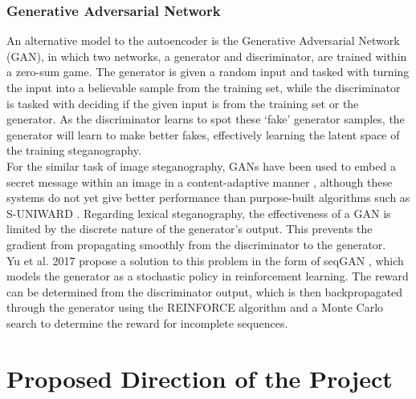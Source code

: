 \documentclass[11pt,a4paper]{article}
\begin{document}
  \subsubsection *{Generative Adversarial Network}
    An alternative model to the autoencoder is the Generative Adversarial Network (GAN), in which two networks, a generator and discriminator, are trained within a zero-sum game. The generator is given a random input and tasked with turning the input into a believable sample from the training set, while the discriminator is tasked with deciding if the given input is from the training set or the generator. As the discriminator learns to spot these `fake' generator samples, the generator will learn to make better fakes, effectively learning the latent space of the training steganography. \\
    \indent For the similar task of image steganography, GANs have been used to embed a secret message within an image in a content-adaptive manner \cite{gan2}, although these systems do not yet give better performance than purpose-built algorithms such as S-UNIWARD \cite{suniward}. Regarding lexical steganography, the effectiveness of a GAN is limited by the discrete nature of the generator's output. This prevents the gradient from propagating smoothly from the discriminator to the generator. \\
    \indent Yu et al. 2017 propose a solution to this problem in the form of seqGAN \nocite{seqgan}, which models the generator as a stochastic policy in reinforcement learning. The reward can be determined from the discriminator output, which is then backpropagated through the generator using the REINFORCE algorithm and a Monte Carlo search to determine the reward for incomplete sequences.




\section *{Proposed Direction of the Project}
  
\end{document}
